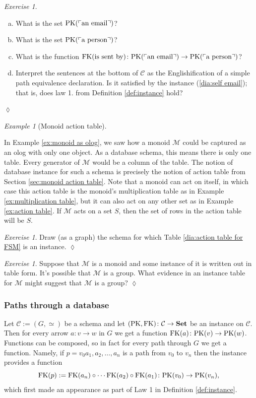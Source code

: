 \documentclass{book}
\def\tn{\textnormal}
\def\mc{\mathcal}
\def\PK{\tn{PK}}
\def\FK{\tn{FK}}
\def\to{\rightarrow}
\def\taking{\colon}
\newcommand{\fakebox}[1]{\tn{$\ulcorner$#1$\urcorner$}}
\def\Set{{\bf Set}}
\def\mcC{\mc{C}}
\def\mcM{\mc{M}}
\theoremstyle{remark}
\newtheorem{example}[subsubsection]{Example}
\newtheorem{exc}[subsubsection]{Exercise}
\newenvironment{exercise}{\begin{exc}}{\hspace*{\fill}$\lozenge$\end{exc}}
\theoremstyle{definition}
\def\sexc{\begin{enumerate}[a.)]\setlength{\itemsep}{.1cm}\setlength{\parskip}{.1cm}\item}
\def\next{\item}
\def\endsexc{\end{enumerate}}
\begin{document}
\begin{exercise}
\sexc What is the set $\PK(\fakebox{an email})$? 
\next What is the set $\PK(\fakebox{a person})$? 
\next What is the function $\FK(\tn{is sent by})\taking\PK(\fakebox{an email})\to\PK(\fakebox{a person})$?
\next Interpret the sentences at the bottom of $\mcC$ as the Englishification of a simple path equivalence declaration. Is it satisfied by the instance (\ref{dia:self email}); that is, does law 1. from Definition \ref{def:instance} hold?
\endsexc
\end{exercise}

\begin{example}[Monoid action table]\label{ex:monoid action table}

In Example \ref{ex:monoid as olog}, we saw how a monoid $\mcM$ could be captured as an olog with only one object. As a database schema, this means there is only one table. Every generator of $\mcM$ would be a column of the table. The notion of database instance for such a schema is precisely the notion of action table from Section \ref{sec:monoid action table}. Note that a monoid can act on itself, in which case this action table is the monoid's multiplication table as in Example \ref{ex:multiplication table}, but it can also act on any other set as in Example \ref{ex:action table}. If $\mcM$ acts on a set $S$, then the set of rows in the action table will be $S$.

\end{example}

\begin{exercise}
Draw (as a graph) the schema for which Table \ref{dia:action table for FSM} is an instance.
\end{exercise}

\begin{exercise}
Suppose that $\mcM$ is a monoid and some instance of it is written out in table form. It's possible that $\mcM$ is a group. What evidence in an instance table for $\mcM$ might suggest that $\mcM$ is a group? 
\end{exercise}


\subsubsection{Paths through a database}

Let $\mcC:=(G,\simeq)$ be a schema and let $(\PK,\FK)\taking\mcC\to\Set$ be an instance on $\mcC$. Then for every arrow $a\taking v\to w$ in $G$ we get a function $\FK(a)\taking\PK(v)\to\PK(w)$. Functions can be composed, so in fact for every path through $G$ we get a function. Namely, if $p=v_0a_1,a_2,\ldots,a_n$ is a path from $v_0$ to $v_n$ then the instance provides a function $$\FK(p):=\FK(a_n)\circ\cdots\FK(a_2)\circ\FK(a_1)\taking\PK(v_0)\to\PK(v_n),$$ which first made an appearance as part of Law 1 in Definition \ref{def:instance}.
\end{document}
